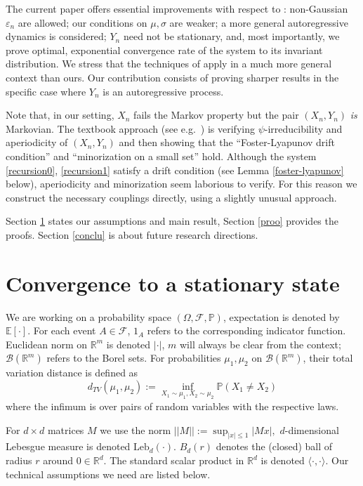 \documentclass{article}
\begin{document}
The current paper offers essential improvements with respect to \cite{varvenne}: non-Gaussian $\varepsilon_n$ 
are allowed; our conditions on $\mu,\sigma$ are weaker; 
a more general autoregressive dynamics is considered; $Y_n$ need not be stationary, and, most importantly, we 
prove optimal, exponential convergence
rate of the system to its invariant distribution. We stress that the techniques of \cite{varvenne} apply 
in a much more general context than ours. Our contribution consists of proving sharper 
results in the specific case where $Y_n$ is an autoregressive process. 

Note that, in our
setting, $X_{n}$ fails the Markov property but the pair $(X_{n},Y_{n})$ \emph{is} Markovian.
The textbook approach (see e.g.\ \cite{mt}) is verifying $\psi$-irreducibility and aperiodicity of $(X_n,Y_n)$ and
then showing that the ``Foster-Lyapunov drift condition'' and ``minorization on a small set'' hold.
Although the system \eqref{recursion0}, \eqref{recursion1} satisfy a drift condition
(see Lemma \ref{foster-lyapunov} below), aperiodicity and minorization
seem laborious to verify. For this reason we construct the necessary couplings directly, using a slightly unusual approach.

Section \ref{resu} states our assumptions and main result, Section \ref{proo} provides the proofs.
Section \ref{conclu} is about future research directions.

\section{Convergence to a stationary state}\label{resu}

We are working on a probability space $(\Omega,\mathcal{F},\mathbb{P})$, expectation is denoted by $\mathbb{E}[\cdot]$. For each
event $A\in\mathcal{F}$, ${1}_{A}$ refers to the corresponding indicator function.
Euclidean norm on $\mathbb{R}^m$ is denoted $|\cdot|$, $m$ will always be clear from the context;
$\mathcal{B}(\mathbb{R}^m)$ refers to the Borel sets.
For probabilities $\mu_1,\mu_2$ on $\mathcal{B}(\mathbb{R}^m)$, their
total variation distance is defined as
$$
d_{TV}(\mu_1,\mu_2):=\inf_{X_1\sim \mu_1,X_2\sim \mu_2}\mathbb{P}(X_1\neq X_2)
$$
where the infimum is over pairs of random variables with the respective laws.

For $d\times d$ matrices $M$ we use the norm 
$
||M||:=\sup_{|x|\leq 1}|Mx|,
$
$d$-dimensional Lebesgue measure is denoted $\mathrm{Leb}_d(\cdot)$. $B_d(r)$ denotes the (closed) ball of
radius $r$ around $0\in\mathbb{R}^d$. The standard scalar product in $\mathbb{R}^d$ is denoted $\langle\cdot,\cdot\rangle$.
Our technical 
assumptions we need are listed below.
\end{document}

